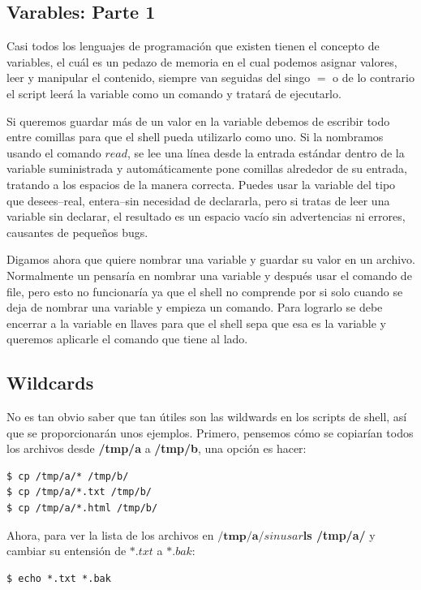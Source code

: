 \documentclass{article}
\begin{document}
\subsection{Varables: Parte 1}
Casi todos los lenguajes de programación que existen tienen el concepto de variables, el cuál es un pedazo de memoria en el cual podemos asignar valores, leer y manipular el contenido, siempre van seguidas del singo $=$ o de lo contrario el script leerá la variable como un comando y tratará de ejecutarlo.

Si queremos guardar más de un valor en la variable debemos de escribir todo entre comillas para que el shell pueda utilizarlo como uno. Si la nombramos usando el comando $read$, se lee una línea desde la entrada estándar dentro de la variable suministrada y automáticamente pone comillas alrededor de su entrada, tratando a los espacios de la manera correcta. Puedes usar la variable del tipo que desees--real, entera--sin necesidad de declararla, pero si tratas de leer una variable sin declarar, el resultado es un espacio vacío sin advertencias ni errores, causantes de pequeños bugs.

Digamos ahora que quiere nombrar una variable y guardar su valor en un archivo. Normalmente un pensaría en nombrar una variable y después usar el comando de file, pero esto no funcionaría ya que el shell no comprende por si solo cuando se deja de nombrar una variable y empieza un comando. Para lograrlo se debe encerrar a la variable en llaves para que el shell sepa que esa es la variable y queremos aplicarle el comando que tiene al lado.

\subsection{Wildcards}
No es tan obvio saber que tan útiles son las wildwards en los scripts de shell, así que se proporcionarán  unos ejemplos. Primero, pensemos cómo se copiarían todos los archivos desde \textbf{/tmp/a} a \textbf{/tmp/b}, una opción es hacer:

\begin{verbatim}
$ cp /tmp/a/* /tmp/b/
$ cp /tmp/a/*.txt /tmp/b/
$ cp /tmp/a/*.html /tmp/b/
\end{verbatim}

Ahora, para ver la lista de los archivos en $\textbf{/tmp/a/} sin usar $\textbf{ls /tmp/a/} y cambiar su entensión de $*.txt$ a $*.bak$:

\begin{verbatim}
$ echo *.txt *.bak
\end{verbatim}
\end{document}
